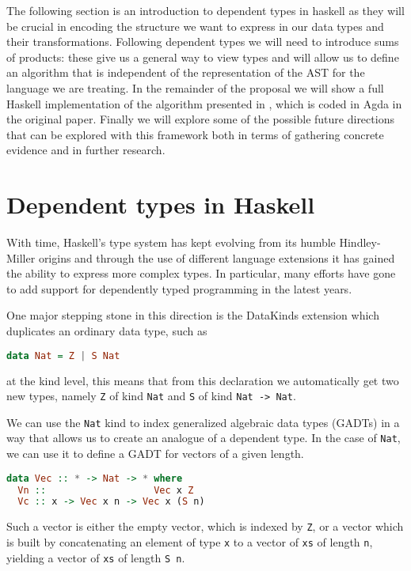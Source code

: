 \documentclass[11pt]{article}
\begin{document}
The following section is an introduction to dependent types in haskell as they will be crucial in encoding 
the structure we want to express in our data types and their transformations. 
Following dependent types we will need to introduce sums of products: these give us a general way to view 
types and will allow us to define an algorithm that is independent of the representation of the AST for the language 
we are treating.
In the remainder of the proposal we will show a full Haskell implementation of the algorithm presented in 
\cite{icfp}, which is coded in Agda in the original paper. Finally we will explore some of the possible 
future directions that can be explored with this framework both in terms of 
gathering concrete evidence and in further research.

\section{Dependent types in
Haskell}\label{dependent-types-in-haskell}

With time, Haskell's type system has kept evolving from its humble
Hindley-Miller origins and through the use of different language extensions it has gained the ability 
to express more complex types. In particular, many efforts have gone to add support for dependently
typed programming in the latest years.

One major stepping stone in this direction is the DataKinds extension which duplicates an ordinary data type, such as

\begin{lstlisting}[language=haskell]
data Nat = Z | S Nat
\end{lstlisting}

at the kind level, this means that from this declaration we automatically get two new types, namely \texttt{Z} of kind \texttt{Nat}
and \texttt{S} of kind \texttt{Nat\ -\textgreater{}\ Nat}.

We can use the \texttt{Nat} kind to index generalized algebraic data
types (GADTs) in a way that allows us to create an analogue of a
dependent type. In the case of \texttt{Nat}, we can use it to define a
GADT for vectors of a given length.

\begin{lstlisting}[language=haskell]
data Vec :: * -> Nat -> * where
  Vn ::                   Vec x Z
  Vc :: x -> Vec x n -> Vec x (S n)
\end{lstlisting}

Such a vector is either the empty vector, which is indexed by
\texttt{Z}, or a vector which is built by concatenating an element of
type \texttt{x} to a vector of \texttt{xs} of length \texttt{n},
yielding a vector of \texttt{xs} of length \texttt{S\ n}.
\end{document}
